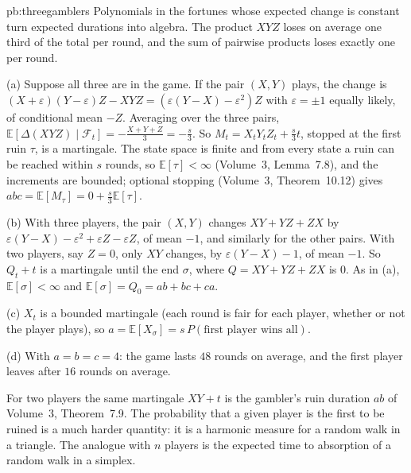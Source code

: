 \begin{solution}{pb:threegamblers}
\idea Polynomials in the fortunes whose expected change is constant turn expected durations into algebra. The product $XYZ$ loses on
average one third of the total per round, and the sum of pairwise products loses exactly one per round.

\writeup (a) Suppose all three are in the game. If the pair $(X,Y)$ plays, the change is $(X+\varepsilon)(Y-\varepsilon)Z-XYZ=(\varepsilon(Y-X)-\varepsilon^2)Z$ with $\varepsilon=\pm1$ equally likely,
of conditional mean $-Z$. Averaging over the three pairs, $\mathbb E[\Delta(XYZ)\mid\mathcal F_t]=-\frac{X+Y+Z}3=-\frac s3$. So $M_t=X_tY_tZ_t+\frac s3t$, stopped at the first ruin
$\tau$, is a martingale. The state space is finite and from every state a ruin can be reached within $s$ rounds, so $\mathbb E[\tau]<\infty$ (Volume~3, Lemma~7.8), and the
increments are bounded; optional stopping (Volume~3, Theorem~10.12) gives $abc=\mathbb E[M_\tau]=0+\frac s3\mathbb E[\tau]$.

(b) With three players, the pair $(X,Y)$ changes $XY+YZ+ZX$ by $\varepsilon(Y-X)-\varepsilon^2+\varepsilon Z-\varepsilon Z$, of mean $-1$, and similarly for the other pairs. With two players,
say $Z=0$, only $XY$ changes, by $\varepsilon(Y-X)-1$, of mean $-1$. So $Q_t+t$ is a martingale until the end $\sigma$, where $Q=XY+YZ+ZX$ is $0$. As in (a), $\mathbb E[\sigma]<\infty$ and
$\mathbb E[\sigma]=Q_0=ab+bc+ca$.

(c) $X_t$ is a bounded martingale (each round is fair for each player, whether or not the player plays), so $a=\mathbb E[X_\sigma]=s\,P(\text{first player wins all})$.

(d) With $a=b=c=4$: the game lasts $48$ rounds on average, and the first player leaves after $16$ rounds on average.

\leads For two players the same martingale $XY+t$ is the gambler's ruin duration $ab$ of Volume~3, Theorem~7.9. The probability that a given player is
the first to be ruined is a much harder quantity: it is a harmonic measure for a random walk in a triangle. The analogue with $n$ players is the expected time to absorption of a random walk in a simplex.
\end{solution}

